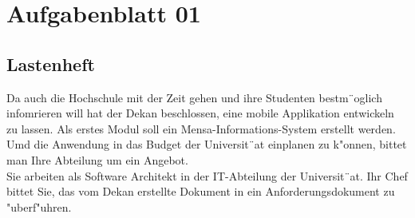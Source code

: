 

\chapter{Aufgabenblatt 01}
\section{Lastenheft}
Da auch die Hochschule mit der Zeit gehen und ihre Studenten bestm¨oglich infomrieren will hat der Dekan beschlossen, eine mobile Applikation entwickeln zu lassen.
Als erstes Modul soll ein Mensa-Informations-System erstellt werden.
Umd die Anwendung in das Budget der Universit¨at einplanen zu k"onnen, bittet man Ihre Abteilung um ein Angebot.\\

\noindent
Sie arbeiten als Software Architekt in der IT-Abteilung der Universit¨at.
Ihr Chef bittet Sie, das vom Dekan erstellte Dokument in ein Anforderungsdokument zu "uberf"uhren.


